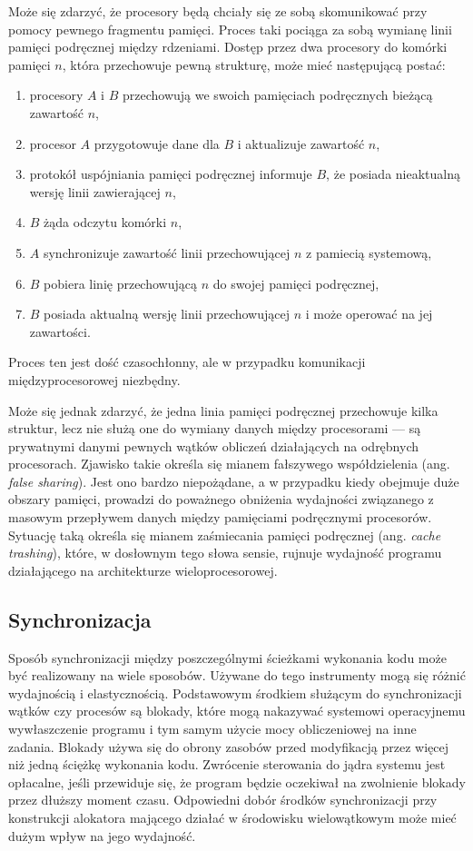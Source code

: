 \documentclass[12pt,a4paper,titlepage,twoside]{mwart}
\begin{document}
Może się zdarzyć, że procesory będą chciały się ze sobą skomunikować przy
pomocy pewnego fragmentu pamięci. Proces taki pociąga za sobą wymianę linii
pamięci podręcznej między rdzeniami. Dostęp przez dwa procesory do komórki
pamięci $n$, która przechowuje pewną strukturę, może mieć następującą postać:

\begin{enumerate}
\item procesory $A$ i $B$ przechowują we swoich pamięciach podręcznych
bieżącą zawartość $n$,
\item procesor $A$ przygotowuje dane dla $B$ i aktualizuje zawartość $n$,
\item protokół uspójniania pamięci podręcznej informuje $B$, że posiada
nieaktualną wersję linii zawierającej $n$,
\item $B$ żąda odczytu komórki $n$,
\item $A$ synchronizuje zawartość linii przechowującej $n$ z pamiecią
systemową,
\item $B$ pobiera linię przechowującą $n$ do swojej pamięci podręcznej,
\item $B$ posiada aktualną wersję linii przechowującej $n$ i może operować na
jej zawartości.
\end{enumerate}

Proces ten jest dość czasochłonny, ale w przypadku komunikacji
międzyprocesorowej niezbędny.

Może się jednak zdarzyć, że jedna linia pamięci podręcznej przechowuje kilka
struktur, lecz nie służą one do wymiany danych między procesorami --- są
prywatnymi danymi pewnych wątków obliczeń działających na odrębnych procesorach.
Zjawisko takie określa się mianem fałszywego współdzielenia (ang. \textit{false
sharing}). Jest ono bardzo niepożądane, a w przypadku kiedy obejmuje duże
obszary pamięci, prowadzi do poważnego obniżenia wydajności związanego z
masowym przepływem danych między pamięciami podręcznymi procesorów. Sytuację
taką określa się mianem zaśmiecania pamięci podręcznej (ang. \textit{cache
trashing}), które, w dosłownym tego słowa sensie, rujnuje wydajność programu
działającego na architekturze wieloprocesorowej.

\subsection{Synchronizacja}

Sposób synchronizacji między poszczególnymi ścieżkami wykonania kodu może być
realizowany na wiele sposobów. Używane do tego instrumenty mogą się różnić
wydajnością i elastycznością. Podstawowym środkiem służącym do synchronizacji
wątków czy procesów są blokady, które mogą nakazywać systemowi operacyjnemu
wywłaszczenie programu i tym samym użycie mocy obliczeniowej na inne zadania.
Blokady używa się do obrony zasobów przed modyfikacją przez więcej niż jedną
ściężkę wykonania kodu. Zwrócenie sterowania do jądra systemu jest opłacalne,
jeśli przewiduje się, że program będzie oczekiwał na zwolnienie blokady przez
dłuższy moment czasu. Odpowiedni dobór środków synchronizacji przy konstrukcji
alokatora mającego działać w środowisku wielowątkowym może mieć dużym wpływ na
jego wydajność.
\end{document}
